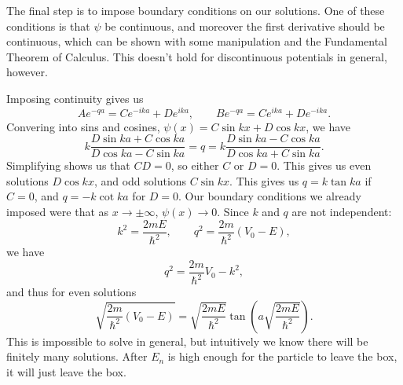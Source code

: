 The final step is to impose boundary conditions on our solutions. One of these conditions is that $\psi $ be continuous, and moreover the first derivative should be continuous, which can be shown with some manipulation and the Fundamental Theorem of Calculus. This doesn't hold for discontinuous potentials in general, however.

Imposing continuity gives us
\[
	Ae^{-qa} =Ce^{-ika} +De^{ika} ,\qquad Be^{-qa} =Ce^{ika} +De^{-ika} 
.\]
Convering into sins and cosines, $\psi (x)=C \sin kx+D \cos kx$, we have
\[
	k\frac{D \sin ka+C \cos ka}{D \cos ka-C \sin ka} =q=k \frac{D \sin ka-C \cos ka}{D \cos ka+C \sin ka} 
.\]
Simplifying shows us that $CD=0$, so either $C$ or $D=0$. This gives us even solutions $D \cos kx$, and odd solutions $C \sin kx$. This gives us $q=k \tan ka$ if $C=0$, and $q=-k \cot ka$ for $D=0$. Our boundary conditions we already imposed were that as $x\to \pm \infty $, $\psi (x)\to 0$. Since $k$ and $q$ are not independent:
\[
	k^2=\frac{2mE}{\hbar ^2} ,\qquad q^2=\frac{2m}{\hbar ^2} (V_0-E),
\]
we have
\[
	q^2=\frac{2m}{\hbar ^2} V_0-k^2,
\]
and thus for even solutions
\[
	\sqrt{\frac{2m}{\hbar ^2} \left( V_0-E \right) } =\sqrt{\frac{2mE}{\hbar ^2} } \tan \left( a\sqrt{\frac{2mE}{\hbar ^2} }  \right) 
.\]
This is impossible to solve in general, but intuitively we know there will be finitely many solutions. After $E_n $ is high enough for the particle to leave the box, it will just leave the box.
